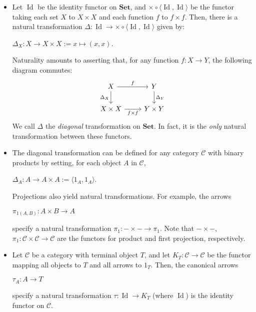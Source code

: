 \documentclass[]{amsbook}
\newcommand{\catname}[1]{\mathbf{#1}}
\newcommand{\0}{\mathbf{0}}
\newcommand{\1}{\mathbf{1}}
\newcommand{\mc}[1]{\mathcal{#1}}
\newcommand{\opn}[1]{\operatorname{#1}}
\begin{document}
\begin{itemize}
    \item Let $\opn{Id}$ be the identity functor on $\catname{Set}$, and
    $\times \circ \langle \opn{Id}, \opn{Id} \rangle$ be the functor taking
    each set $X$ to $X \times X$ and each function $f$ to $f \times f$. Then,
    there is a natural transformation $\Delta: \opn{Id} \to \times \circ
    \langle \opn{Id}, \opn{Id} \rangle$ given by:
    \begin{center}
        $\Delta_X: X \to X \times X := x \mapsto (x, x)$.
    \end{center}
    Naturality amounts to asserting that, for any function $f: X \to Y$, the
    following diagram commutes:
    \[
    \begin{tikzcd}
        X \arrow[r, "f"]
          \arrow[d, swap, "\Delta_X"]
          & Y \arrow[d, "\Delta_Y"]\\
        X \times X \arrow[r, swap, "f \times f"]
                   & Y \times Y
    \end{tikzcd}
    \]
    We call $\Delta$ the \emph{diagonal} transformation on $\catname{Set}$. In
    fact, it is the \emph{only} natural transformation between these functors.

    \item The diagonal transformation can be defined for any category $\mc{C}$
    with binary products by setting, for each object $A$ in $\mc{C}$,
    \begin{center}
        $\Delta_A: A \to A \times A := \langle 1_A, 1_A \rangle$.
    \end{center}
    Projections also yield natural transformations. For example, the arrows
    \begin{center}
        $\pi_{1 (A, B)}: A \times B \to A$
    \end{center}
    specify a natural transformation $\pi_1: - \times - \to \pi_1$. Note that
    $- \times -$, $\pi_1: \mc{C} \times \mc{C} \to \mc{C}$ are the functors for
    product and first projection, respectively.

    \item Let $\mc{C}$ be a category with terminal object $T$, and let $K_T:
    \mc{C} \to \mc{C}$ be the functor mapping all objects to $T$ and all
    arrows to $1_T$. Then, the canonical arrows
    \begin{center}
        $\tau_A : A \to T$
    \end{center}
    specify a natural transformation $\tau: \opn{Id} \to K_T$ (where $\opn{Id}$)
    is the identity functor on $\mc{C}$.


\end{itemize}
\end{document}
